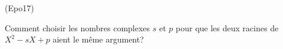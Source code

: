 \begin{tiny}(Epo17)\end{tiny}
Comment choisir les nombres complexes $s$ et $p$ pour que les deux racines de $X^2-sX+p$ aient le même argument?